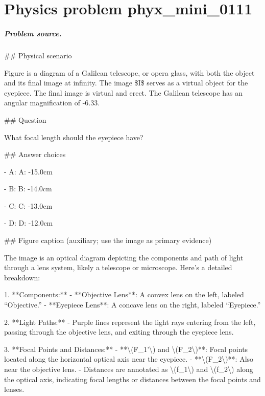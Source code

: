
\chapter{Physics problem phyx\_mini\_0111}
\label{ch:PhyXMiniProblems_problem_phyx_mini_0111}

\paragraph{Problem source.}
\#\# Physical scenario

Figure is a diagram of a Galilean telescope, or opera glass, with both the object and its final image at infinity. The image \$I\$ serves as a virtual object for the eyepiece. The final image is virtual and erect. The Galilean telescope has an angular magnification of -6.33.

\#\# Question

What focal length should the eyepiece have?

\#\# Answer choices

- A: A: -15.0cm

- B: B: -14.0cm

- C: C: -13.0cm

- D: D: -12.0cm

\#\# Figure caption (auxiliary; use the image as primary evidence)

The image is an optical diagram depicting the components and path of light through a lens system, likely a telescope or microscope. Here's a detailed breakdown:

1. **Components:**
   - **Objective Lens**: A convex lens on the left, labeled “Objective.”
   - **Eyepiece Lens**: A concave lens on the right, labeled “Eyepiece.”

2. **Light Paths:**
   - Purple lines represent the light rays entering from the left, passing through the objective lens, and exiting through the eyepiece lens.

3. **Focal Points and Distances:**
   - **\textbackslash{}(F\_1'\textbackslash{}) and \textbackslash{}(F\_2\textbackslash{})**: Focal points located along the horizontal optical axis near the eyepiece.
   - **\textbackslash{}(F\_2\textbackslash{})**: Also near the objective lens.
   - Distances are annotated as \textbackslash{}(f\_1\textbackslash{}) and \textbackslash{}(f\_2\textbackslash{}) along the optical axis, indicating focal lengths or distances between the focal points and lenses.

